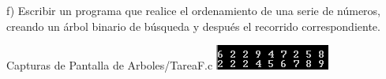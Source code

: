f) Escribir un programa que realice el ordenamiento
de una serie de números, creando un árbol binario de
búsqueda y después el recorrido correspondiente.

Capturas de Pantalla de Arboles/TareaF.c
\newline
\includegraphics{Arboles/img/TareaF_1.png}